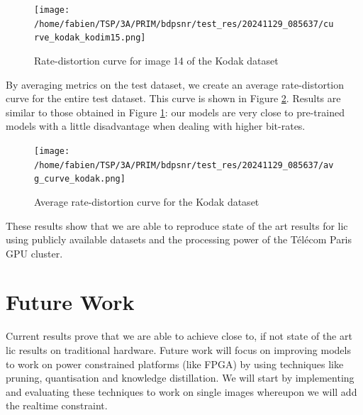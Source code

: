 \begin{figure}
    \centering
    \texttt{[image: /home/fabien/TSP/3A/PRIM/bdpsnr/test\_res/20241129\_085637/curve\_kodak\_kodim15.png]}
    \caption{Rate-distortion curve for image 14 of the Kodak dataset}
    \label{bdpsnr_3}
\end{figure}

By averaging metrics on the test dataset, we create an average rate-distortion curve for the entire test dataset. This curve is shown in Figure \ref{bdpsnr_4}. Results are similar to those obtained in Figure \ref{bdpsnr_3}: our models are very close to pre-trained models with a little disadvantage when dealing with higher bit-rates.

\begin{figure}
    \centering
    \texttt{[image: /home/fabien/TSP/3A/PRIM/bdpsnr/test\_res/20241129\_085637/avg\_curve\_kodak.png]}
    \caption{Average rate-distortion curve for the Kodak dataset}
    \label{bdpsnr_4}
\end{figure}

These results show that we are able to reproduce state of the art results for \acrshort{lic} using publicly available datasets and the processing power of the Télécom Paris GPU cluster.

\section{Future Work}
Current results prove that we are able to achieve close to, if not state of the art \acrshort{lic} results on traditional hardware. Future work will focus on improving models to work on power constrained platforms (like FPGA) by using techniques like pruning, quantisation and knowledge distillation. We will start by implementing and evaluating these techniques to work on single images whereupon we will add the realtime constraint.